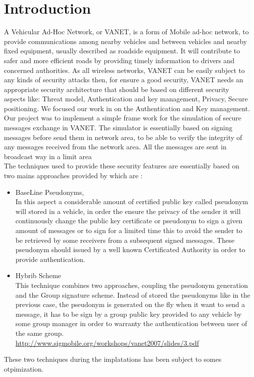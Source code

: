 \section{Introduction}
A Vehicular Ad-Hoc Network, or VANET, is a form of Mobile ad-hoc network, to provide communications among nearby vehicles and between vehicles and nearby fixed equipment, usually described as roadside equipment. It will contribute to safer and more efficient roads by providing timely information to drivers and concerned authorities.
As all wireless networks, VANET can be easily subject to any kinds of security  attacks then, for ensure a good security, VANET needs an appropriate security architecture that should be based on different security aspects like: Threat model, Authentication and key management, Privacy, Secure positioning. We focused our work in on the  Authentication and Key management.\\
Our project was to implement a simple frame work for the simulation of secure messages exchange in VANET. The simulator is essentially based on  signing  messages before send them in network area, to be able to verify the integrity of any messages received from the network area. All the messages are sent in broadcast way in a limit area\\
The techniques used to provide these security features are essentially based on two mains approaches provided
 by\cite{calandriello} which are :
\begin{itemize}
\item BaseLine Pseudonyms,\\
In this aspect a considerable amount of certified public key called pseudonym  will stored in a vehicle, in order the ensure the privacy of the sender it will continuously change the public key certificate or pseudonym to sign a given amount of messages or to sign for a limited time this to avoid the sender to be retrieved by some receivers from a subsequent signed messages. These pseudonym should issued by a well known Certificated Authority in order to provide authentication.

\item Hybrib Scheme\\
This technique combines two approaches, coupling the pseudonym generation and the Group signature scheme.
Instead of stored the pseudonyms like in the previous case, the pseudonym  is generated on the fly when it want to send a message, it has to be sign by a group public key provided to any vehicle by some group manager in order to warranty the authentication between user of the same group.
\\
\url{http://www.sigmobile.org/workshops/vanet2007/slides/3.pdf}
\end{itemize}
These two techniques during the implatations has been subject to somes otpimization.
